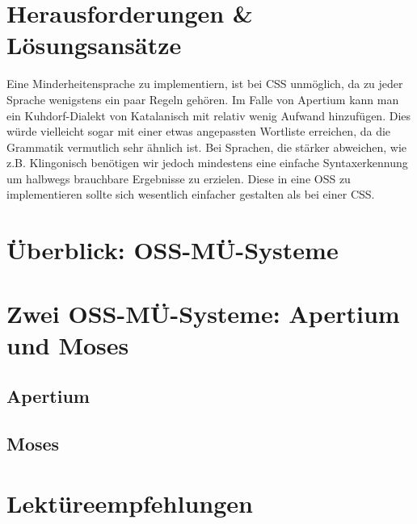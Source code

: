 \documentclass[11pt,twoside]{mparticle}
\begin{document}
\section{Herausforderungen \& Lösungsansätze}
\label{herausforderungen}
Eine Minderheitensprache zu implementiern, ist bei CSS unmöglich, da
zu jeder Sprache wenigstens ein paar Regeln gehören. Im Falle von
Apertium kann man ein Kuhdorf-Dialekt von Katalanisch mit relativ
wenig Aufwand hinzufügen. Dies würde vielleicht sogar mit einer etwas
angepassten Wortliste erreichen, da die Grammatik vermutlich sehr
ähnlich ist. Bei Sprachen, die stärker abweichen, wie z.B. Klingonisch
benötigen wir jedoch mindestens eine einfache Syntaxerkennung um
halbwegs brauchbare Ergebnisse zu erzielen. Diese in eine OSS zu
implementieren sollte sich wesentlich einfacher gestalten als bei
einer CSS.

\section{Überblick: OSS-MÜ-Systeme}
\label{ueberblick}

\section{Zwei OSS-MÜ-Systeme: Apertium und Moses}
\label{apertiumMoses}

\subsection{Apertium}

\subsection{Moses}

\section{Lektüreempfehlungen}
\label{lektuere}



\end{document}
